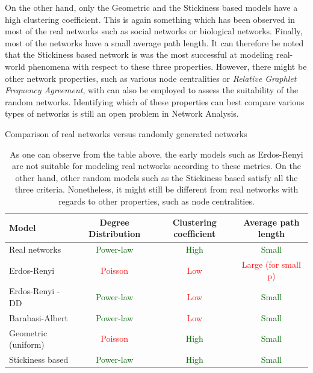 On the other hand, only the Geometric and the Stickiness based models have a
high clustering coefficient. This is again something which has been observed in
most of the real networks such as social networks or biological networks.
Finally, most of the networks have a small average path length. It can
therefore be noted that the Stickiness based network is was the most successful
at modeling real-world phenomena with respect to these three properties.
However, there might be other network properties, such as various node
centralities\cite{newman2009networks} or \emph{Relative Graphlet Frequency
Agreement}, with can also be employed to
assess the suitability of the random networks. Identifying which of these 
properties can best compare various types of networks is still an open problem in
Network Analysis.




\begin{table}
  \centering
  Comparison of real networks versus randomly generated networks 
  \begin{tabular}{ | l | c | c | c |  }
    \hline
    \cellcolor{blue3} Model & \cellcolor{blue3} Degree Distribution &
  \cellcolor{blue3} Clustering coefficient & \cellcolor{blue3} Average path
length \\
    \hline
    Real networks & \textcolor{darkgreen}{Power-law} &
  \textcolor{darkgreen}{High} & \textcolor{darkgreen}{Small}\\
    \hline
    Erdos-Renyi & \textcolor{red}{Poisson} & \textcolor{red}{Low} &
  \textcolor{red}{Large (for small p)} \\
    \hline
    Erdos-Renyi - DD & \textcolor{darkgreen}{Power-law} &
  \textcolor{red}{Low} & \textcolor{darkgreen}{Small} \\
    \hline
    Barabasi-Albert & \textcolor{darkgreen}{Power-law} &
  \textcolor{red}{Low} & \textcolor{darkgreen}{Small} \\
    \hline
    Geometric (uniform) & \textcolor{red}{Poisson} &
  \textcolor{darkgreen}{High} & \textcolor{darkgreen}{Small} \\
    \hline
    Stickiness based & \textcolor{darkgreen}{Power-law} &
  \textcolor{darkgreen}{High} & \textcolor{darkgreen}{Small} \\
    \hline
  \end{tabular}
  \caption{As one can observe from the table above, the early models
such as Erdos-Renyi are not suitable for modeling real networks according to
these metrics. On the other hand, other random models such as the Stickiness
based satisfy all the three criteria. Nonetheless, it might still be different
from real networks with regards to other properties, such as node
centralities\cite{newman2009networks}. }
  \label{tab:network_comparison}
\end{table}

